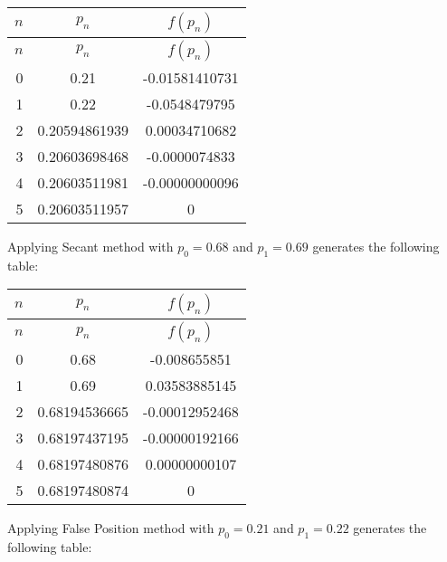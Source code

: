 \documentclass[../../../../Assignments]{subfiles}
\begin{document}
\begin{solution}
\begin{enumerate}[label = \alph*)]
            \begin{longtable}{r S[table-format=1.11] S[table-format=-1.11]}
                \toprule
                \(n\)  &    {\(p_n\)}    &   {\(f(p_n)\)}   \\
                \midrule
                \endfirsthead
                \(n\)  &    {\(p_n\)}    &   {\(f(p_n)\)}   \\
                \midrule
                  &  0.21           &  -0.01581410731  \\
                    1  &  0.22           &  -0.0548479795   \\
                    2  &  0.20594861939  &   0.00034710682  \\
                    3  &  0.20603698468  &  -0.0000074833   \\
                    4  &  0.20603511981  &  -0.00000000096  \\
                    5  &  0.20603511957  &   0              \\
                \bottomrule
            \end{longtable}

            Applying Secant method with \(p_0 = \num{0.68}\) and \(p_1 =
            \num{0.69}\) generates the following table:

            \begin{longtable}{r S[table-format=1.11] S[table-format=-1.11]}
                \toprule
                \(n\)  &    {\(p_n\)}    &   {\(f(p_n)\)}   \\
                \midrule
                \endfirsthead
                \(n\)  &    {\(p_n\)}    &   {\(f(p_n)\)}   \\
                \midrule
                  &  0.68           &  -0.008655851    \\
                    1  &  0.69           &   0.03583885145  \\
                    2  &  0.68194536665  &  -0.00012952468  \\
                    3  &  0.68197437195  &  -0.00000192166  \\
                    4  &  0.68197480876  &   0.00000000107  \\
                    5  &  0.68197480874  &   0              \\
                \bottomrule
            \end{longtable}

            Applying False Position method with \(p_0 = \num{0.21}\) and \(p_1 =
            \num{0.22}\) generates the following table:


\end{enumerate}
\end{solution}
\end{document}
